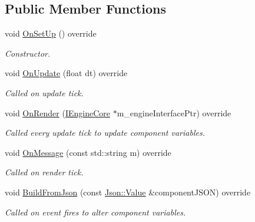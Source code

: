 \subsection*{Public Member Functions}
\begin{DoxyCompactItemize}
\item 
void \hyperlink{class_colour_component_a80105f216269f3282c51918a0d13c12d}{On\+Set\+Up} () override
\begin{DoxyCompactList}\small\item\em Constructor. \end{DoxyCompactList}\item 
\hypertarget{class_colour_component_ae45e91aebb680031bb1328c7c189ea15}{void \hyperlink{class_colour_component_ae45e91aebb680031bb1328c7c189ea15}{On\+Update} (float dt) override}\label{class_colour_component_ae45e91aebb680031bb1328c7c189ea15}

\begin{DoxyCompactList}\small\item\em Called on update tick. \end{DoxyCompactList}\item 
\hypertarget{class_colour_component_a2038d839286cb0a5f0eec0cc11780700}{void \hyperlink{class_colour_component_a2038d839286cb0a5f0eec0cc11780700}{On\+Render} (\hyperlink{class_i_engine_core}{I\+Engine\+Core} $\ast$m\+\_\+engine\+Interface\+Ptr) override}\label{class_colour_component_a2038d839286cb0a5f0eec0cc11780700}

\begin{DoxyCompactList}\small\item\em Called every update tick to update component variables. \end{DoxyCompactList}\item 
void \hyperlink{class_colour_component_a40b859f0c124ddbe92ff1e53bdb398a0}{On\+Message} (const std\+::string m) override
\begin{DoxyCompactList}\small\item\em Called on render tick. \end{DoxyCompactList}\item 
\hypertarget{class_colour_component_aed1ca4037054bfa011639dd3fcebeb34}{void \hyperlink{class_colour_component_aed1ca4037054bfa011639dd3fcebeb34}{Build\+From\+Json} (const \hyperlink{class_json_1_1_value}{Json\+::\+Value} \&component\+J\+S\+O\+N) override}\label{class_colour_component_aed1ca4037054bfa011639dd3fcebeb34}

\begin{DoxyCompactList}\small\item\em Called on event fires to alter component variables. \end{DoxyCompactList}\end{DoxyCompactItemize}
